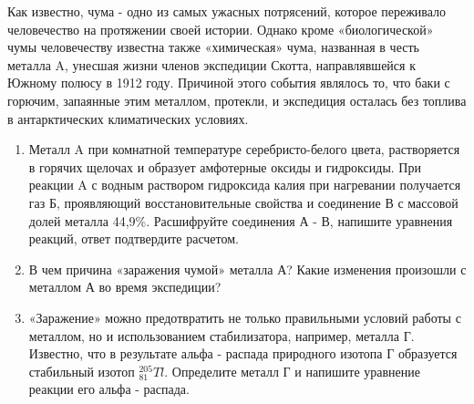 
Как известно, чума - одно из самых ужасных потрясений, которое переживало человечество на протяжении 
своей истории. Однако кроме «биологической» чумы человечеству известна также «химическая» чума, названная 
в честь металла A, унесшая жизни членов экспедиции Скотта, направлявшейся к Южному полюсу в 1912 году. 
Причиной этого события являлось то, что баки с горючим, запаянные этим металлом, протекли, и экспедиция 
осталась без топлива в антарктических климатических условиях.

\begin{enumerate}
    \item Металл A при комнатной температуре серебристо-белого цвета, растворяется в горячих щелочах и 
    образует амфотерные оксиды и гидроксиды. При реакции A с водным раствором гидроксида калия при нагревании 
    получается газ Б, проявляющий восстановительные свойства и соединение В с массовой долей металла 44,9\%. 
    Расшифруйте соединения А - В, напишите уравнения реакций, ответ подтвердите расчетом.
    \item В чем причина «заражения чумой» металла А? Какие изменения произошли с металлом А во время экспедиции?
    \item «Заражение» можно предотвратить не только  правильными условий работы с металлом, но и использованием 
    стабилизатора, например, металла Г. Известно, что в результате альфа - распада природного изотопа Г 
    образуется стабильный изотоп $_{81}^{205}Tl$. Определите металл Г и напишите уравнение реакции его альфа - распада.
\end{enumerate}